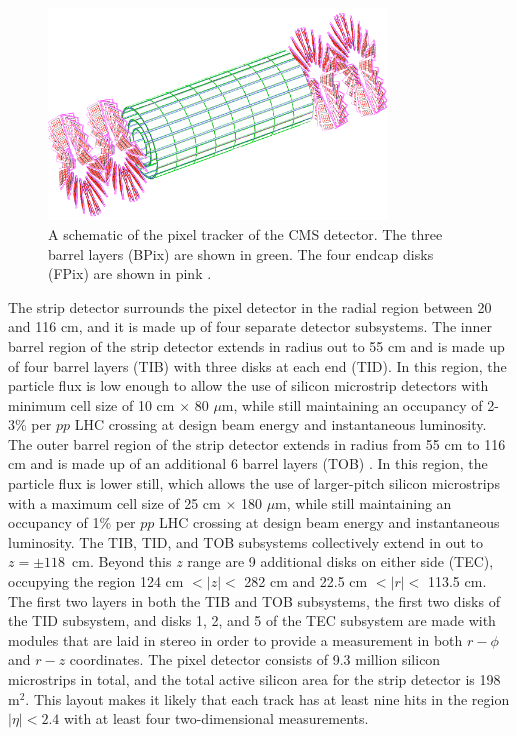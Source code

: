\begin{figure}
  \centering
  \includegraphics[width=0.8\textwidth]{tex/cms/fig/tracker-pixel-schematic.png}
  \caption{A schematic of the pixel tracker of the CMS detector.  
    The three barrel layers (BPix) are shown in green. The four 
    endcap disks (FPix) are shown in pink \cite{cms-tdr}.}
  \label{fig:pixel}
\end{figure}

The strip detector surrounds the pixel detector in the radial
region between 20 and 116 cm, and it is made up of four separate 
detector subsystems.
The inner barrel region of the strip detector extends in radius out to 
55 cm and is made up of four barrel layers (TIB)
with three disks at each end (TID).
In this region, the particle 
flux is low enough to allow the use of silicon microstrip 
detectors with minimum cell size of 10 cm $\times$ 80 $\mu\text{m}$, while
still maintaining an occupancy of 2-3\% per $pp$ LHC crossing at
design beam energy and instantaneous luminosity.
The outer barrel region of the strip detector extends in radius from 55 cm to 116 cm
and is made up of an additional 6 barrel layers (TOB)
.
In this region, the particle flux is lower still, which allows the use
of larger-pitch silicon microstrips with a maximum cell size of 25 cm $\times$ 
180 $\mu\text{m}$, while still maintaining an occupancy of 1\% per $pp$ LHC crossing at
design beam energy and instantaneous luminosity.
The TIB, TID, and TOB subsystems collectively extend in out to 
$z=\pm 118$~cm.  Beyond this $z$ range are 9 additional disks on either side (TEC), 
occupying the region 124 cm $< |z| <$ 282 cm and 22.5 cm $< |r| < $ 113.5 cm.
The first two layers in both the TIB and TOB subsystems, 
the first two disks of the TID subsystem, and disks 1, 2, and 5 of the TEC subsystem 
are made with modules
that are laid in stereo in order to provide a measurement in both $r-\phi$ and $r-z$ 
coordinates.  
The pixel detector consists of 9.3 million silicon microstrips in total, and the
total active silicon area for the strip detector is 198 $\text{m}^2$.
This layout makes it likely that each track has at least nine hits in the region $|\eta| < 2.4$
with at least four two-dimensional measurements.

